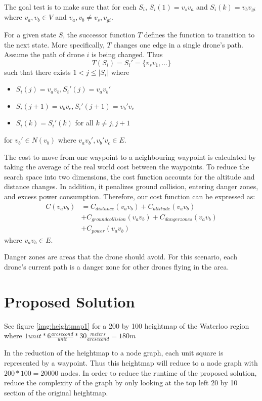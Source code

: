 \documentclass[conference]{IEEEtran}
\begin{document}
The goal test is to make sure that for each $S_i$, $S_i(1) = v_sv_a$ and $S_i(k) = v_bv_{gi}$ where $v_a, v_b \in V$ and $v_a, v_b \neq v_s, v_{gi}$.

For a given state $S$, the successor function $T$ defines the function to transition to the next state. More specifically, $T$ changes one edge in a single drone's path. Assume the path of drone $i$ is being changed. Thus
$$ T(S_i) = S_i' = \{ v_sv_1, ... \} $$
such that there exists $ 1 < j \leq |S_i| $ where
\begin{itemize}
\item $S_i(j) = v_av_b, S_i'(j) = v_av_b'$
\item $S_i(j+1) = v_bv_c, S_i'(j+1) = v_b'v_c$
\item $S_i(k) = S_i'(k)$ for all $k \neq j, j+1$
\end{itemize}
for $v_b' \in N(v_b)$ where $v_av_b', v_b'v_c \in E$.

The cost to move from one waypoint to a neighbouring waypoint is calculated by taking the average of the real world cost between the waypoints. To reduce the search space into two dimensions, the cost function accounts for the altitude and distance changes. In addition, it penalizes ground collision, entering danger zones, and excess power consumption. Therefore, our cost function can be expressed as:
\begin{equation} \label{eq:cost}
\begin{split}
C(v_av_b) &= C_{distance}(v_av_b) + C_{altitude}(v_av_b) \\
&+ C_{ground collision}(v_av_b) + C_{danger zones}(v_av_b) \\
&+ C_{power}(v_av_b)
\end{split}
\end{equation}
where $v_av_b \in E$.

Danger zones are areas that the drone should avoid. For this scenario, each drone's current path is a danger zone for other drones flying in the area.

\section{Proposed Solution}
See figure \ref{img:heightmap1} for a 200 by 100 heightmap of the Waterloo region where $1 unit * 6 \frac{arcsecond}{unit} * 30 \frac{meters}{arcsecond} = 180m$

In the reduction of the heightmap to a node graph, each unit square is represented by a waypoint. Thus this heightmap will reduce to a node graph with $200 * 100 = 20000$ nodes. In order to reduce the runtime of the proposed solution, reduce the complexity of the graph by only looking at the top left 20 by 10 section of the original heightmap.
\end{document}
